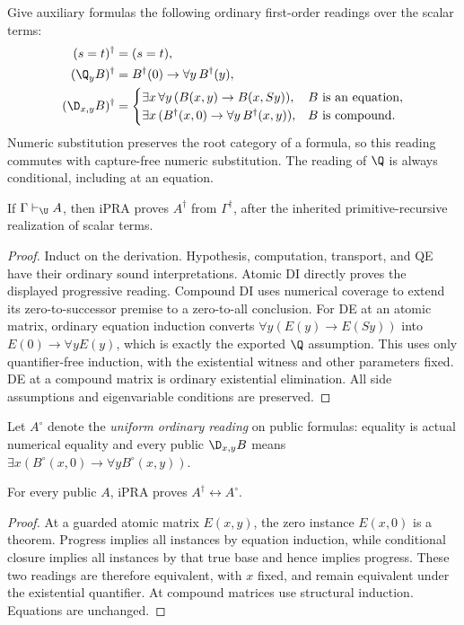 Give auxiliary formulas the following ordinary first-order readings over
the scalar terms:
\[
 \begin{aligned}
 (s=t)^\dagger&=(s=t),\\
 (\Q_y B)^\dagger&=B^\dagger(0)\to\forall y\,B^\dagger(y),\\
 (\D_{x,y}B)^\dagger&=
 \begin{cases}
 \exists x\,\forall y\,(B(x,y)\to B(x,Sy)),&B\text{ is an equation},\\
 \exists x\,(B^\dagger(x,0)\to\forall y\,B^\dagger(x,y)),
       &B\text{ is compound}.
 \end{cases}
 \end{aligned}
\]
Numeric substitution preserves the root category of a formula, so this
reading commutes with capture-free numeric substitution.  The reading of
$\Q$ is always conditional, including at an equation.

\begin{theorem}\label{thm:aux-soundness}
If $\Gamma\vdash_{\U}A$, then iPRA proves $A^\dagger$ from
$\Gamma^\dagger$, after the inherited primitive-recursive realization
of scalar terms.
\end{theorem}
\begin{proof}
Induct on the derivation.  Hypothesis, computation, transport, and QE
have their ordinary sound interpretations.  Atomic DI directly proves
the displayed progressive reading.  Compound DI uses numerical coverage
to extend its zero-to-successor premise to a zero-to-all conclusion.
For DE at an atomic matrix, ordinary equation induction converts
$\forall y(E(y)\to E(Sy))$ into $E(0)\to\forall yE(y)$, which is
exactly the exported $\Q$ assumption.  This uses only quantifier-free
induction, with the existential witness and other parameters fixed.
DE at a compound matrix is ordinary existential elimination.
All side assumptions and eigenvariable conditions are preserved.
\end{proof}

Let $A^\circ$ denote the \emph{uniform ordinary reading} on public
formulas: equality is actual numerical equality and every public
$\D_{x,y}B$ means $\exists x(B^\circ(x,0)\to\forall yB^\circ(x,y))$.

\begin{lemma}\label{lem:public-agreement}
For every public $A$, iPRA proves $A^\dagger\leftrightarrow A^\circ$.
\end{lemma}
\begin{proof}
At a guarded atomic matrix $E(x,y)$, the zero instance $E(x,0)$ is a
theorem.  Progress implies all instances by equation induction, while
conditional closure implies all instances by that true base and hence
implies progress.  These two readings are therefore equivalent, with
$x$ fixed, and remain equivalent under the existential quantifier.
At compound matrices use structural induction.  Equations are unchanged.
\end{proof}


